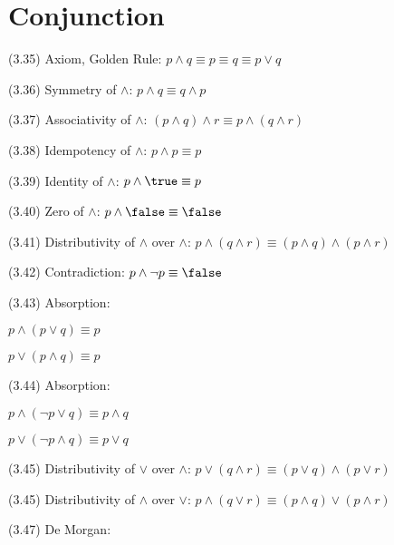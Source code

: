 \documentclass[a4paper,10pt]{article}
\newenvironment{theoremlist}{
\begin{description}
  \setlength{\itemsep}{1.5pt}
  \setlength{\parskip}{0pt}
  \setlength{\parsep}{0pt}
}{\end{description}}
\begin{document}
\section{Conjunction}

\begin{theoremlist}
\item[(3.35) Axiom, Golden Rule:]						$ p \land q \equiv p \equiv q \equiv p \lor q $
\item[(3.36) Symmetry of $\land$:]						$ p \land q \equiv q \land p $
\item[(3.37) Associativity of $\land$:]						$ (p \land q) \land r \equiv p \land (q \land r) $
\item[(3.38) Idempotency of $\land$:]						$ p \land p \equiv p $
\item[(3.39) Identity of $\land$:]						$ p \land \true \equiv p $
\item[(3.40) Zero of $\land$:]							$ p \land \false \equiv \false  $
\item[(3.41) Distributivity of $\land$ over $\land$:]				$ p \land (q \land r) \equiv (p \land q) \land (p \land r) $
\item[(3.42) Contradiction:]							$ p \land \lnot p \equiv \false $
\item[(3.43) Absorption:]						
  \begin{theoremlist}
  \item %
  \item										$ p \land (p \lor q) \equiv p $
  \item 									$ p \lor (p \land q) \equiv p $
  \end{theoremlist}                  						                               	              
\item[(3.44) Absorption:]
  \begin{theoremlist}
  \item %
  \item										$ p \land (\lnot p \lor q) \equiv p \land q $
  \item 									$ p \lor (\lnot p \land q) \equiv p \lor q $
  \end{theoremlist}      
\item[(3.45) Distributivity of $\lor$ over $\land$:]				$ p \lor (q \land r) \equiv (p \lor q) \land (p \lor r) $
\item[(3.45) Distributivity of $\land$ over $\lor$:]				$ p \land (q \lor r) \equiv (p \land q) \lor (p \land r) $
\item[(3.47) De Morgan:]

\end{theoremlist}
\end{document}
